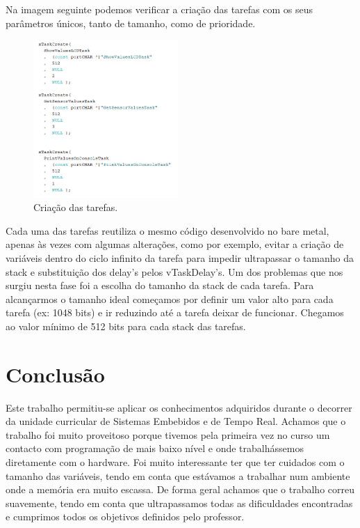 \documentclass[11pt]{report}
\begin{document}
Na imagem seguinte podemos verificar a criação das tarefas com os seus parâmetros únicos, tanto de tamanho, como de prioridade.

\begin{figure} [!h]
\centering
\includegraphics[width=55mm]{Prints/task.png}
\caption{Criação das tarefas.}
\label{Rotulo}
\end{figure}

\clearpage


Cada uma das tarefas reutiliza o mesmo código desenvolvido no bare metal, apenas às vezes com algumas alterações, como por exemplo, evitar a criação de variáveis dentro do ciclo infinito da tarefa para impedir ultrapassar o tamanho da stack e substituição dos delay's pelos  vTaskDelay's. Um dos problemas que nos surgiu nesta fase foi a escolha do tamanho da stack de cada tarefa. Para alcançarmos o tamanho ideal começamos por definir um valor alto para cada tarefa (ex: 1048 bits) e ir reduzindo até a tarefa deixar de funcionar. Chegamos ao valor mínimo de 512 bits para cada stack das tarefas.



\clearpage



\chapter*{Conclusão}

Este trabalho permitiu-se aplicar os conhecimentos adquiridos durante o decorrer da unidade curricular de Sistemas Embebidos e de Tempo Real. Achamos que o trabalho foi muito proveitoso porque tivemos pela primeira vez no curso um contacto com programação de mais baixo nível e onde trabalhássemos diretamente com o hardware. Foi muito interessante ter que ter cuidados com o tamanho das variáveis, tendo em conta que estávamos a trabalhar num ambiente onde a memória era muito escassa. De forma geral achamos que o trabalho correu suavemente, tendo em conta que ultrapassamos todas as dificuldades encontradas  e cumprimos todos os objetivos definidos pelo professor.
\end{document}
